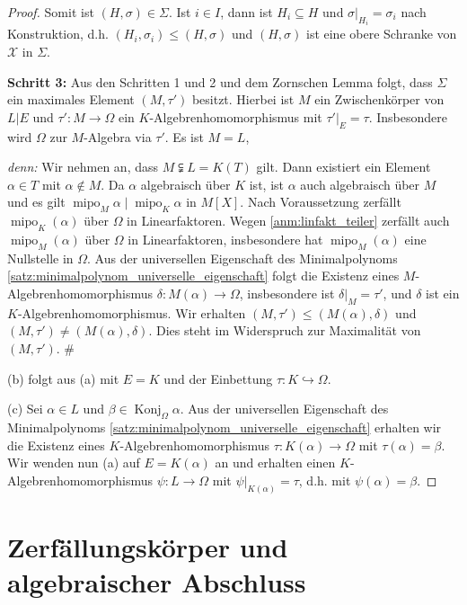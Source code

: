 \documentclass[a4paper, twoside, 11pt, ngerman]{report}
\newcommand{\calX}{\mathcal X}
\DeclareMathOperator{\Konj}{Konj}
\DeclareMathOperator{\mipo}{mipo}
\theoremstyle{definistyle}
\theoremstyle{remark}
\newenvironment{denn}%
  {\par\textit{denn:}}%
  {\hfill\#\par}
\begin{document}
\begin{proof}
Somit ist $(H, \sigma) \in \Sigma$. Ist $i\in I$, dann ist $H_i \subseteq H$ und $\sigma|_{H_i} = \sigma_i$ nach Konstruktion, d.h. $(H_i, \sigma_i) \leq (H, \sigma)$ und $(H, \sigma)$ ist eine obere Schranke von $\calX$ in $\Sigma$.

\textbf{Schritt 3:} Aus den Schritten 1 und 2 und dem Zornschen Lemma folgt, dass 
$\Sigma$ ein maximales Element $(M, \tau')$ besitzt. Hierbei ist $M$ ein Zwischenkörper von $L|E$ und $\tau' \colon M \to \Omega$ ein $K$-Algebrenhomomorphismus mit $\tau'|_E = \tau$. Insbesondere wird $\Omega$ zur $M$-Algebra via $\tau'$. Es ist $M = L$,
\begin{denn}
Wir nehmen an, dass $M\subsetneqq L=K(T)$ gilt. Dann existiert ein Element $\alpha\in T$ mit $\alpha\not\in M$.
Da $\alpha$ algebraisch über $K$ ist, ist $\alpha$ auch algebraisch über $M$ und es gilt $\mipo_M\alpha\mid\mipo_K\alpha$
in $M[X]$. Nach Voraussetzung zerfällt $\operatorname{mipo}_K(\alpha)$ über $\Omega$ in Linearfaktoren. 
Wegen \ref{anm:linfakt_teiler} zerfällt auch $\operatorname{mipo}_M(\alpha)$ über $\Omega$ in Linearfaktoren,
insbesondere hat $\operatorname{mipo}_M(\alpha)$ eine Nullstelle in $\Omega$. Aus der universellen Eigenschaft des Minimalpolynoms \ref{satz:minimalpolynom_universelle_eigenschaft} folgt die Existenz eines 
$M$-Algebrenhomomorphismus $\delta \colon M(\alpha) \to \Omega$, insbesondere ist $\delta|_{M}=\tau'$, und $\delta$
ist ein $K$-Algebrenhomomorphismus. Wir erhalten $(M,\tau')\leq(M(\alpha),\delta)$ und $(M,\tau')\neq(M(\alpha),\delta)$.
Dies steht im Widerspruch zur Maximalität von $(M,\tau')$.
\end{denn}
(b) folgt aus (a) mit $E = K$ und der Einbettung $\tau\colon K\hookrightarrow\Omega$.

(c) Sei $\alpha\in L$ und $\beta\in\Konj_\Omega\alpha$.
Aus der universellen Eigenschaft des Minimalpolynoms \ref{satz:minimalpolynom_universelle_eigenschaft} erhalten wir die Existenz eines $K$-Algebrenhomomorphismus $\tau\colon K(\alpha)\to\Omega$ mit $\tau(\alpha)=\beta$.
Wir wenden nun (a) auf $E=K(\alpha)$ an und erhalten einen $K$-Algebrenhomomorphismus $\psi \colon L \to \Omega$ mit $\psi|_{K(\alpha)} = \tau$, d.h. mit $\psi(\alpha) = \beta$.
\end{proof}

\section{Zerfällungskörper und algebraischer Abschluss}
\end{document}
